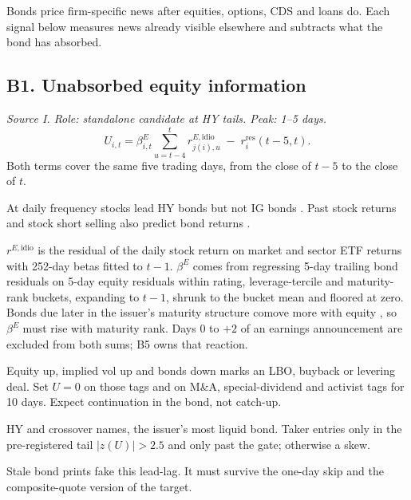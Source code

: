 \documentclass[11pt,letterpaper]{article}
\newcommand{\rres}{r^{\mathrm{res}}}      %
\begin{document}
Bonds price firm-specific news after equities, options, CDS and loans do. Each signal below measures news already visible elsewhere and subtracts what the bond has absorbed.

\subsection{B1. Unabsorbed equity information}
\emph{Source I. Role: standalone candidate at HY tails. Peak: 1--5 days.}
\begin{equation}
U_{i,t}=\beta^{E}_{i,t}\sum_{u=t-4}^{t} r^{E,\mathrm{idio}}_{j(i),u}\;-\;\rres_i(t-5,t).
\end{equation}
Both terms cover the same five trading days, from the close of $t-5$ to the close of $t$.
\begin{spec}
\item[Mechanism and evidence.] At daily frequency stocks lead HY bonds but not IG bonds \cite{tolikas2018}. Past stock returns and stock short selling also predict bond returns \cite{hkr2020}.
\item[Build.] $r^{E,\mathrm{idio}}$ is the residual of the daily stock return on market and sector ETF returns with 252-day betas fitted to $t-1$. $\beta^{E}$ comes from regressing 5-day trailing bond residuals on 5-day equity residuals within rating, leverage-tercile and maturity-rank buckets, expanding to $t-1$, shrunk to the bucket mean and floored at zero. Bonds due later in the issuer's maturity structure comove more with equity \cite{bh2017}, so $\beta^{E}$ must rise with maturity rank. Days 0 to $+2$ of an earnings announcement are excluded from both sums; B5 owns that reaction.
\item[Wealth-transfer override.] Equity up, implied vol up and bonds down marks an LBO, buyback or levering deal. Set $U=0$ on those tags and on M\&A, special-dividend and activist tags for 10 days. Expect continuation in the bond, not catch-up.
\item[Role in the quote.] HY and crossover names, the issuer's most liquid bond. Taker entries only in the pre-registered tail $|z(U)|>2.5$ and only past the gate; otherwise a skew.
\item[Decay and pitfalls.] Stale bond prints fake this lead-lag. It must survive the one-day skip and the composite-quote version of the target.
\end{spec}
\end{document}
